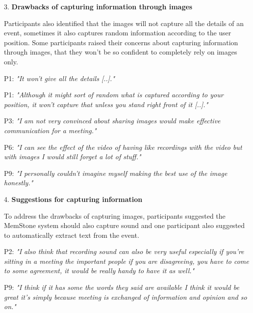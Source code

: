 \documentclass[mscthesis]{usiinfthesis}
\begin{document}
3. \textbf{Drawbacks of capturing information through images}

Participants also identified that the images will not capture all the details of an event, sometimes it also captures random information according to the user position. Some participants raised their concerns about capturing information through images, that they won't be so confident to completely rely on images only. 
\newline
\hspace{\parindent}\begin{adjustwidth}{1cm}{1cm}
\hspace{\parindent}P1: \textit{"It won't give all the details [..]."} 

P1: \textit{"Although it might sort of random what is captured according to your position, it won't capture that unless you stand right front of it [..]."}

P3: \textit{"I am not very convinced about sharing images would make effective communication for a meeting."}

P6: \textit{"I can see the effect of the video of having like recordings with the video but with images I would still forget a lot of stuff."}

P9: \textit{"I personally couldn't imagine myself making the best use of the image honestly."}
\newline
\end{adjustwidth}

4. \textbf{Suggestions for capturing information}

To address the drawbacks of capturing images, participants suggested the MemStone system should also capture sound and one participant also suggested to automatically extract text from the event. 
\newline
\hspace{\parindent}\begin{adjustwidth}{1cm}{1cm}
\hspace{\parindent}P2: \textit{"I also think that recording sound can also be very useful especially if you're sitting in a meeting the important people if you are disagreeing, you have to come to some agreement, it would be really handy to have it as well."}

P9:\textit{ "I think if it has some the words they said are available I think it would be great it's simply because meeting is exchanged of information and opinion and so on."}
\newline
\end{adjustwidth}
\end{document}
